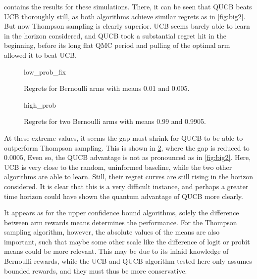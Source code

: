  contains the results for these simulations.
There, it can be seen that QUCB beats UCB thoroughly still, as both algorithms achieve similar regrets as in \cref{fig:big2}.
But now Thompson sampling is clearly superior.
UCB seems barely able to learn in the horizon considered, and QUCB took a substantial regret hit in the beginning, before its long flat QMC period and pulling of the optimal arm allowed it to beat UCB.


\begin{figure}[p]
    \centering
    \newcommand{\myoptions}{
        width=10cm,
        height=8cm,
        xlabel={Kiloturn},
        ylabel={Regret},
        legend entries={UCB, QUCB, Thompson},
        legend pos=north west,
        legend cell align=left,
        mystyle,
    }
    {low_prob_fix}
    \caption{Regrets for Bernoulli arms with means 0.01 and 0.005.}
    \label{fig:low_prob_fix}
\end{figure}

\begin{figure}[p]
    \centering
    \newcommand{\myoptions}{
        width=10cm,
        height=8cm,
        xlabel={Kiloturn},
        ylabel={Regret},
        legend entries={UCB, QUCB, Thompson},
        legend pos=north west,
        legend cell align=left,
        mystyle,
    }
    {high_prob}
    \caption{Regrets for two Bernoulli arms with means 0.99 and 0.9905.}
    \label{fig:high_prob}
\end{figure}

At these extreme values, it seems the gap must shrink for QUCB to be able to outperform Thompson sampling.
This is shown in \cref{fig:high_prob}, where the gap is reduced to $0.0005$,
Even so, the QUCB advantage is not as pronounced as in \cref{fig:big2}.
Here, UCB is very close to the random, uninformed baseline, while the two other algorithms are able to learn.
Still, their regret curves are still rising in the horizon considered.
It is clear that this is a very difficult instance, and perhaps a greater time horizon could have shown the quantum advantage of QUCB more clearly.

It appears as for the upper confidence bound algorithms, solely the difference between arm rewards means determines the performance.
For the Thompson sampling algorithm, however, the absolute values of the means are also important, such that maybe some other scale like the difference of logit or probit means could be more relevant.
This may be due to its inlaid knowledge of Bernoulli rewards, while the UCB and QUCB algorithm tested here only assumes bounded rewards, and they must thus be more conservative.

